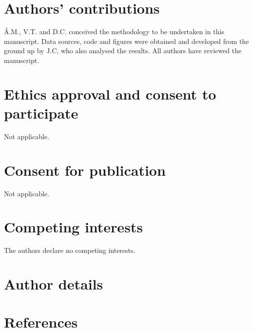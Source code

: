 \documentclass[10pt,twocolumn]{wlscirep}
\begin{document}
\section{Authors' contributions} \label{sec-authors-contributions}

Á.M., V.T. and D.C. conceived the methodology to be undertaken in this manuscript. Data sources, code and figures were obtained and developed from the ground up by J.C, who also analysed the results. All authors have reviewed the manuscript.

\section{Ethics approval and consent to participate} \label{sec-ethics-approval}
Not applicable.

\section{Consent for publication} \label{sec-consent-for-publication}
Not applicable.

\section{Competing interests} \label{sec-competing-interests}
The authors declare no competing interests.

\section{Author details} \label{sec-author-details}

\section{References} \label{sec-references}


\end{document}
